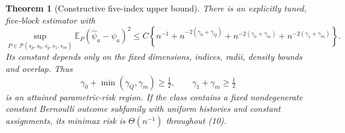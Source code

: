 \documentclass[11pt]{article}
\newtheorem{theorem}{Theorem}
\theoremstyle{definition}
\begin{document}
\begin{theorem}[Constructive five-index upper bound]
There is an explicitly tuned, five-block estimator with
\[
 \sup_{P\in\mathcal P(s_p,s_0,s_g,s_1,s_m)}
   \mathbb E_P(\widehat\psi_a-\psi_a)^2
 \le C\left\{n^{-1}+n^{-2(\gamma_0+\gamma_Q)}
                 +n^{-2(\gamma_0+\gamma_m)}+n^{-2(\gamma_1+\gamma_m)}\right\}.       \tag{9}
\]
Its constant depends only on the fixed dimensions, indices, radii,
density bounds and overlap. Thus
\[
 \gamma_0+\min(\gamma_Q,\gamma_m)\ge\tfrac12,\qquad
 \gamma_1+\gamma_m\ge\tfrac12                                  \tag{10}
\]
is an attained parametric-risk region. If the class contains a fixed
nondegenerate constant Bernoulli outcome subfamily with uniform histories
and constant assignments, its minimax risk is $\Theta(n^{-1})$ throughout
(10).
\end{theorem}
\end{document}
